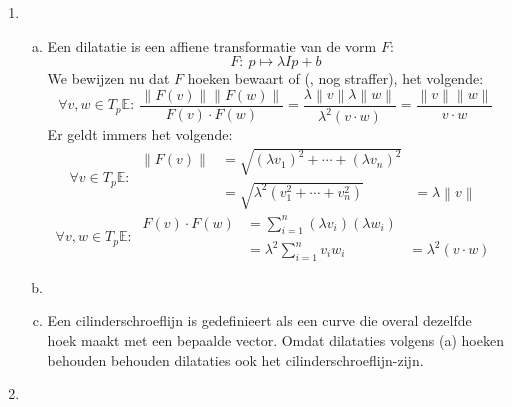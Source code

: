 \documentclass[main.tex]{subfiles}
\begin{document}
\begin{enumerate}
\item
  \begin{enumerate}[(a)]
  \item 
    Een dilatatie is een affiene transformatie van de vorm $F$:
    \[ F:\ p \mapsto \lambda Ip+b \] We bewijzen nu dat $F$ hoeken
    bewaart of (, nog straffer), het volgende:
    \[
    \forall v,w \in T_{p}\mathbb{E}:\
    \frac{\left\|F(v)\right\|\left\|F(w)\right\|}{F(v) \cdot F(w)} =
    \frac{\lambda\left\|v\right\|\lambda\left\|w\right\|}{\lambda^{2}(v\cdot
      w)} = \frac{\left\|v\right\|\left\|w\right\|}{v\cdot w}
    \]
    Er geldt immers het volgende:
    \[
    \forall v \in T_{p}\mathbb{E}:\
    \begin{array}{rll}
      \left\|F(v)\right\| &= \sqrt{ (\lambda v_{1})^{2} + \dotsb + (\lambda v_{n})^{2} }\\
      &= \sqrt{ \lambda^{2} (v_{1}^{2} + \dotsb + v_{n}^{2}) } &= \lambda \left\|v\right\|
    \end{array}
    \]
    \[
    \forall v,w \in T_{p}\mathbb{E}:\
    \begin{array}{rll}
      F(v)\cdot F(w)  &= \sum_{i=1}^{n}(\lambda v_{i})(\lambda w_{i})\\
      &= \lambda^{2} \sum_{i=1}^{n} v_{i}w_{i} &= \lambda^{2}(v\cdot w)
    \end{array}
    \]
  \item 
    \TODO{}
  \item 
    Een cilinderschroeflijn is gedefinieert als een curve die overal dezelfde hoek maakt met een bepaalde vector.
    Omdat dilataties volgens (a) hoeken behouden behouden dilataties ook het cilinderschroeflijn-zijn.
  \end{enumerate}

\item 
\TODO


\end{enumerate}





%
%
%
%
\end{document}
